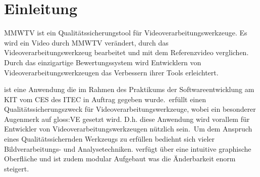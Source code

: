 \chapter{Einleitung}
\begin{normalsize}

MMWTV ist ein Qualitätssicherungstool für Videoverarbeitungswerkzeuge. %
Es wird ein Video durch MMWTV verändert, durch das Videoverarbeitungswerkzeug bearbeitet und mit dem Referenzvideo verglichen.
Durch das einzigartige Bewertungssystem wird Entwicklern von Videoverarbeitungswerkzeugen
das Verbessern ihrer Tools erleichtert.

\projektTitel ist eine Anwendung die im Rahmen des Praktikums der Softwareentwicklung am \gls{KIT} vom \gls{CES} des \gls{ITEC} in Auftrag gegeben wurde.\
\projektTitel erfüllt einen Qualitätssicherungszweck für Videoverarbeitungswerkzeuge, wobei ein besonderer Augenmerk auf \gls{gloss:VE} gesetzt wird. D.h. diese Anwendung wird vorallem für Entwickler von Videoverarbeitungswerkzeugen nützlich sein.\
Um dem Anspruch eines Qualitätssichernden Werkzeugs zu erfüllen bediehnt \projektTitel sich vieler Bildverarbeitungs- und Analysetechniken. \projektTitel verfügt über eine intuitive graphische Oberfläche und ist zudem modular Aufgebaut was die Änderbarkeit enorm steigert.

\end{normalsize}



